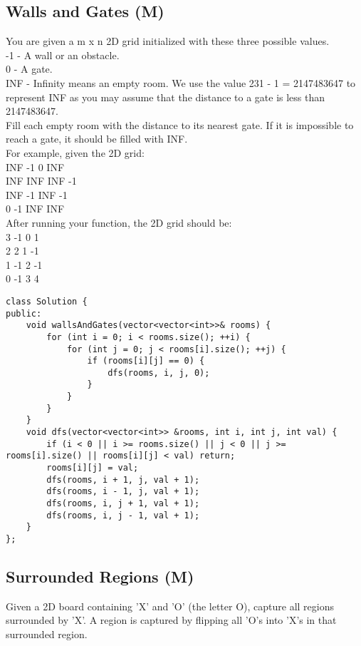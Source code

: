 \subsection{Walls and Gates (M)}
You are given a m x n 2D grid initialized with these three possible values.\\
    -1 - A wall or an obstacle.\\
    0 - A gate.\\
    INF - Infinity means an empty room. We use the value 231 - 1 = 2147483647 to represent INF as you may assume that the distance to a gate is less than 2147483647.\\

Fill each empty room with the distance to its nearest gate. If it is impossible to reach a gate, it should be filled with INF.\\

For example, given the 2D grid:\\
INF  -1  0  INF\\
INF INF INF  -1\\
INF  -1 INF  -1\\
  0  -1 INF INF\\

After running your function, the 2D grid should be:\\
  3  -1   0   1\\
  2   2   1  -1\\
  1  -1   2  -1\\
  0  -1   3   4\\

\begin{lstlisting}
class Solution {
public:
    void wallsAndGates(vector<vector<int>>& rooms) {
        for (int i = 0; i < rooms.size(); ++i) {
            for (int j = 0; j < rooms[i].size(); ++j) {
                if (rooms[i][j] == 0) {
                    dfs(rooms, i, j, 0);
                }
            }
        }
    }
    void dfs(vector<vector<int>> &rooms, int i, int j, int val) {
        if (i < 0 || i >= rooms.size() || j < 0 || j >= rooms[i].size() || rooms[i][j] < val) return;
        rooms[i][j] = val;
        dfs(rooms, i + 1, j, val + 1);
        dfs(rooms, i - 1, j, val + 1);
        dfs(rooms, i, j + 1, val + 1);
        dfs(rooms, i, j - 1, val + 1);
    }
};
\end{lstlisting}


\subsection{Surrounded Regions (M)}
Given a 2D board containing 'X' and 'O' (the letter O), capture all regions surrounded by 'X'. A region is captured by flipping all 'O's into 'X's in that surrounded region.\\


